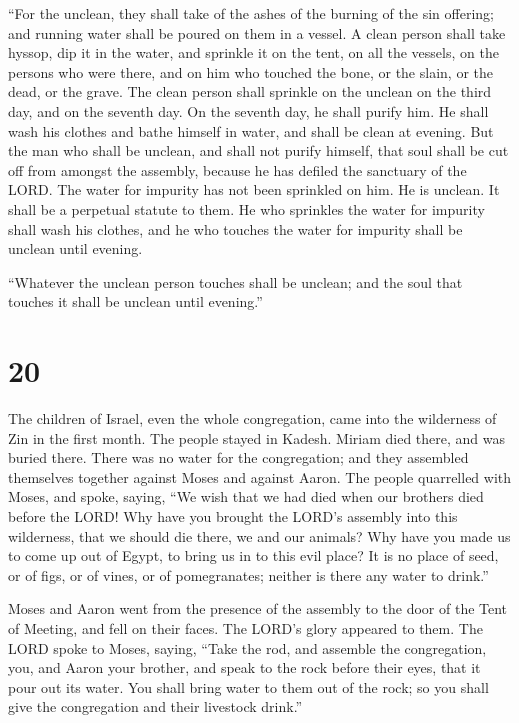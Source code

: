  ``For the unclean, they shall take of the ashes of the
burning of the sin offering; and running water shall be poured on them
in a vessel.  A clean person shall take hyssop, dip it in
the water, and sprinkle it on the tent, on all the vessels, on the
persons who were there, and on him who touched the bone, or the slain,
or the dead, or the grave.  The clean person shall sprinkle
on the unclean on the third day, and on the seventh day. On the seventh
day, he shall purify him. He shall wash his clothes and bathe himself in
water, and shall be clean at evening.  But the man who
shall be unclean, and shall not purify himself, that soul shall be cut
off from amongst the assembly, because he has defiled the sanctuary of
the LORD. The water for impurity has not been sprinkled on him. He is
unclean.  It shall be a perpetual statute to them. He who
sprinkles the water for impurity shall wash his clothes, and he who
touches the water for impurity shall be unclean until evening.

 ``Whatever the unclean person touches shall be unclean;
and the soul that touches it shall be unclean until evening.''

\hypertarget{section-19}{%
\section{20}\label{section-19}}

 The children of Israel, even the whole congregation, came
into the wilderness of Zin in the first month. The people stayed in
Kadesh. Miriam died there, and was buried there.  There was
no water for the congregation; and they assembled themselves together
against Moses and against Aaron.  The people quarrelled with
Moses, and spoke, saying, ``We wish that we had died when our brothers
died before the LORD!  Why have you brought the LORD's
assembly into this wilderness, that we should die there, we and our
animals?  Why have you made us to come up out of Egypt, to
bring us in to this evil place? It is no place of seed, or of figs, or
of vines, or of pomegranates; neither is there any water to drink.''

 Moses and Aaron went from the presence of the assembly to
the door of the Tent of Meeting, and fell on their faces. The LORD's
glory appeared to them.  The LORD spoke to Moses, saying,
 ``Take the rod, and assemble the congregation, you, and
Aaron your brother, and speak to the rock before their eyes, that it
pour out its water. You shall bring water to them out of the rock; so
you shall give the congregation and their livestock drink.''

